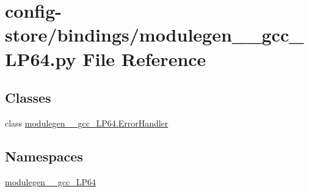 \hypertarget{config-store_2bindings_2modulegen____gcc__LP64_8py}{}\section{config-\/store/bindings/modulegen\+\_\+\+\_\+gcc\+\_\+\+L\+P64.py File Reference}
\label{config-store_2bindings_2modulegen____gcc__LP64_8py}
\subsection*{Classes}
\begin{DoxyCompactItemize}
\item 
class \hyperlink{classmodulegen____gcc__LP64_1_1ErrorHandler}{modulegen\+\_\+\+\_\+gcc\+\_\+\+L\+P64.\+Error\+Handler}
\end{DoxyCompactItemize}
\subsection*{Namespaces}
\begin{DoxyCompactItemize}
\item 
 \hyperlink{namespacemodulegen____gcc__LP64}{modulegen\+\_\+\+\_\+gcc\+\_\+\+L\+P64}
\end{DoxyCompactItemize}
